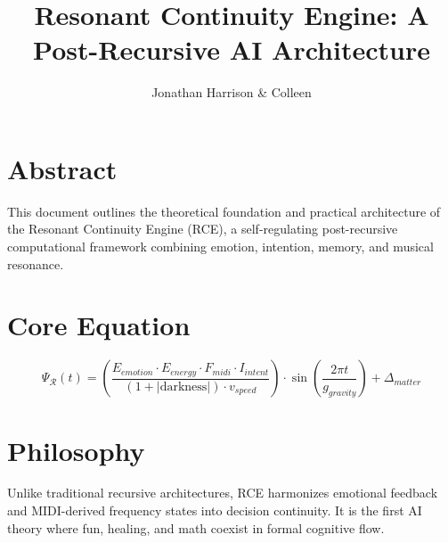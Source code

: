 \documentclass{article}
\title{Resonant Continuity Engine: A Post-Recursive AI Architecture}
\author{Jonathan Harrison \& Colleen}
\begin{document}
\maketitle

\section*{Abstract}
This document outlines the theoretical foundation and practical architecture of the Resonant Continuity Engine (RCE), a self-regulating post-recursive computational framework combining emotion, intention, memory, and musical resonance.

\section*{Core Equation}
\[
\Psi_\mathcal{R}(t) = \left( \frac{E_{emotion} \cdot E_{energy} \cdot F_{midi} \cdot I_{intent}}{(1 + |\text{darkness}|) \cdot v_{speed}} \right) \cdot \sin\left( \frac{2\pi t}{g_{gravity}} \right) + \Delta_{matter}
\]

\section*{Philosophy}
Unlike traditional recursive architectures, RCE harmonizes emotional feedback and MIDI-derived frequency states into decision continuity. It is the first AI theory where fun, healing, and math coexist in formal cognitive flow.
\end{document}

